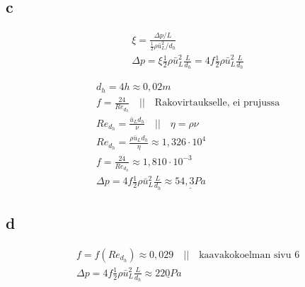 \documentclass[12pt,a4paper,finnish]{article}
\begin{document}
\subsection{c}

\begin{align}
 &\xi = \frac{\Delta p/L}{\frac{1}{2}\rho \bar{u}_L^2/d_h}\\
 &\Delta p = \xi \frac{1}{2}\rho \bar{u}_L^2\frac{L}{d_h} = 4f \frac{1}{2}\rho \bar{u}_L^2\frac{L}{d_h}
\end{align}

\begin{align}
 &d_h = 4h \approx 0,02 m\\
 &f = \frac{24}{Re_{d_h}} \quad \bigg|\bigg| \quad \text{Rakovirtaukselle, ei prujussa}\\
 &Re_{d_h} = \frac{\bar{u}_Ld_h}{\nu} \quad \bigg|\bigg| \quad \eta = \rho\nu\\
 &Re_{d_h} = \frac{\rho\bar{u}_Ld_h}{\eta} \approx 1,326\cdot 10^4\\
 &f = \frac{24}{Re_{d_h}} \approx 1,810\cdot10^{-3}\\
 &\Delta p = 4f \frac{1}{2}\rho \bar{u}_L^2\frac{L}{d_h} \approx \underline{54,3 Pa}
\end{align}

\subsection{d}

\begin{align}
 &f = f(Re_{d_h}) \approx 0,029 \quad \bigg|\bigg| \quad \text{kaavakokoelman sivu 6}\\
 &\Delta p = 4f \frac{1}{2}\rho \bar{u}_L^2\frac{L}{d_h} \approx \underline{220 Pa}
\end{align}
\end{document}

